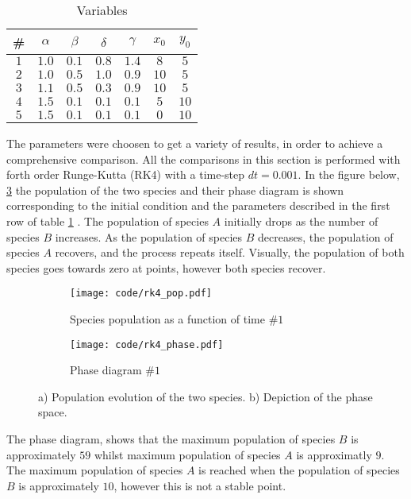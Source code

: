 \documentclass[a4paper]{article}
\newcommand{\newparagraph}{\vspace{.5cm}\noindent}
\begin{document}
\begin{table}[H]
    \centering
    \caption{Variables}
    \begin{tabular}{|c|c|c|c|c|c|c|}\hline
        \# &$\alpha$ & $\beta$ & $\delta$ & $\gamma$ & $x_0$ & $y_0$ \\\hline
        $1$ & $1.0$ & $0.1$ & $0.8$ & $1.4$ & $8$ & $5$\\\hline
        $2$ & $1.0$ & $0.5$ & $1.0$ & $0.9$ & $10$ & $5$\\\hline
        $3$ & $1.1$ & $0.5$ & $0.3$ & $0.9$ & $10$ & $5$ \\\hline
        $4$ & $1.5$ & $0.1$ & $0.1$ & $0.1$ & $5$ & $10$\\\hline
        $5$ & $1.5$ & $0.1$ & $0.1$ & $0.1$ & $0$ & $10$\\\hline
    \end{tabular}
    \label{tab: variables}
\end{table}\noindent
The parameters were choosen to get a variety of results, in order to achieve a comprehensive comparison. All the comparisons in this section is performed with forth order Runge-Kutta (RK4) with a time-step $dt = 0.001$.
\newparagraph
In the figure below, \ref{fig: param 1} the population of the two species and their phase diagram is shown corresponding to the initial condition and the parameters described in the first row of table \ref{tab: variables}  . The population of species $A$ initially drops as the number of species $B$ increases. As the population of species $B$ decreases, the population of species $A$ recovers, and the process repeats itself. Visually, the population of both species goes towards zero at points, however both species recover. 
\begin{figure}[H]
    \centering
    \begin{subfigure}{0.45\textwidth}
        \texttt{[image: code/rk4\_pop.pdf]}
        \caption{Species population as a function of time $\#1$}
        \label{fig: param 1 pop}
    \end{subfigure}
    \hfill    
    \begin{subfigure}{0.45\textwidth}
        \texttt{[image: code/rk4\_phase.pdf]}
        \caption{Phase diagram $\#1$}
        \label{fig: param 1 phase}
    \end{subfigure}
    \caption{a) Population evolution of the two species. b) Depiction of the phase space.}
    \label{fig: param 1}
\end{figure}\noindent
The phase diagram, shows that the maximum population of species $B$ is approximately $59$ whilst maximum population of species $A$ is approximatly $9$. The maximum population of species $A$ is reached when the population of species $B$ is approximately $10$, however this is not a stable point.
\end{document}
